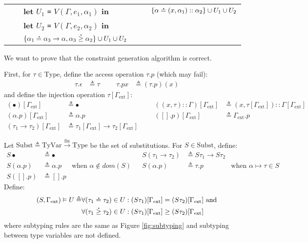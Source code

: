 \documentclass{article}
\theoremstyle{definition}
\newcommand*{\cons}{::}
\newcommand*{\A}[1]{\overset{\,_{\mbox{\Large .}}}{#1}}
\newcommand*{\fin}[2]{{#1}\xrightarrow{\text{fin}}{#2}}
\newcommand*{\TyVar}{\text{TyVar}}
\newcommand*{\Type}{\text{Type}}
\newcommand*{\Subst}{\text{Subst}}
\newcommand*{\external}{\Gamma_{\text{ext}}}
\begin{document}
\begin{tabular}{rclrcl}
                                 &              & \textbf{let} $U_1$ \texttt{=} $V(\Gamma,e_1,\alpha_1)$ \textbf{in}                   &                                            &              & $\{\alpha\A{=}(x,\alpha_1)\cons\alpha_2\}\cup U_1\cup U_2$                          \\
                                 &              & \textbf{let} $U_2$ \texttt{=} $V(\Gamma,e_2,\alpha_2)$ \textbf{in}                                                                                                                                                                     \\
                                 &              & $\{\alpha_1\A{=}\alpha_3\rightarrow\alpha,\alpha_3\A{\ge}\alpha_2\}\cup U_1\cup U_2$
\end{tabular}

\vphantom{}

We want to prove that the constraint generation algorithm is correct.

First, for $\tau\in\Type$, define the access operation $\tau.p$ (which may fail):
\begin{align*}
  \tau.\epsilon & \triangleq\tau &  &  & \tau.px & \triangleq(\tau.p)(x)
\end{align*}
and define the injection operation $\tau[\external]$:
\begin{align*}
  (\bullet)[\external]                 & \triangleq\bullet                                       &  &  & ((x,\tau)\cons\Gamma)[\external] & \triangleq(x,\tau[\external])\cons\Gamma[\external] \\
  (\alpha.p)[\external]                & \triangleq\alpha.p                                      &  &  & ([].p)[\external]                & \triangleq\external.p                               \\
  (\tau_1\rightarrow\tau_2)[\external] & \triangleq\tau_1[\external]\rightarrow\tau_2[\external]
\end{align*}

Let $\Subst\triangleq\fin{\TyVar}{\Type}$ be the set of substitutions.
For $S\in\Subst$, define:
\begin{align*}
  S\bullet    & \triangleq\bullet  &                                  &  & S(\tau_1\rightarrow\tau_2) & \triangleq S\tau_1\rightarrow S\tau_2                                      \\
  S(\alpha.p) & \triangleq\alpha.p & \text{when }\alpha\not\in dom(S) &  & S(\alpha.p)                & \triangleq \tau.p                     & \text{when }\alpha\mapsto\tau\in S \\
  S([].p)     & \triangleq [].p
\end{align*}
Define:
\begin{align*}
  (S,\external)\vDash U\triangleq & \forall(\tau_1\A{=}\tau_2)\in U:(S\tau_1)[\external]= (S\tau_2)[\external]\text{ and} \\
                                  & \forall(\tau_1\A{\ge}\tau_2)\in U:(S\tau_1)[\external]\ge(S\tau_2)[\external]
\end{align*}
where subtyping rules are the same as Figure \ref{fig:subtyping} and subtyping between type variables are not defined.
\end{document}
